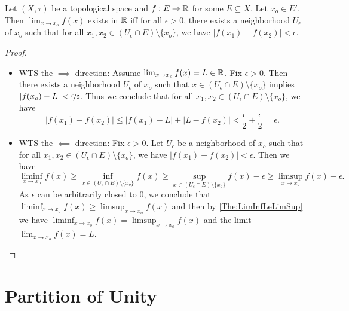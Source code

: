 \documentclass[screen,single]{techreport}
\numberwithin{equation}{section}
\begin{document}
\begin{theorem}\label{The:CauchyLemma}
  Let $(X,\tau)$ be a topological space and $f : E \to \mathbb{R}$ for some $E \subseteq X$.
  Let $x_o \in E'$.
  Then $\lim_{x \to x_o} f(x)$ exists in $\mathbb{R}$ iff for all $\epsilon > 0$, there exists a neighborhood $U_\epsilon$ of $x_o$ such that for all $x_1,x_2 \in (U_\epsilon \cap E) \setminus \{ x_o \}$, we have $|f(x_1)-f(x_2)| < \epsilon$.
\end{theorem}
\begin{proof}\
  \begin{itemize}
    \item WTS the $\implies$ direction: Assume $\lim_{x \to x_o} f(x) = L \in \mathbb{R}$.
    Fix $\epsilon > 0$.
    Then there exists a neighborhood $U_\epsilon$ of $x_o$ such that $x \in (U_\epsilon \cap E) \setminus \{x_o\}$ implies $|f(x_o)-L| < \nicefrac{\epsilon}{2}$.
    Thus we conclude that for all $x_1,x_2 \in (U_\epsilon \cap E) \setminus \{x_o\}$, we have
    \[
    |f(x_1)-f(x_2)| \le |f(x_1)-L|+|L-f(x_2)| < \frac{\epsilon}{2}+\frac{\epsilon}{2} = \epsilon.
    \]
    
    \item WTS the $\impliedby$ direction: Fix $\epsilon > 0$. Let $U_\epsilon$ be a neighborhood of $x_o$ such that for all $x_1,x_2 \in (U_\epsilon \cap E) \setminus \{x_o\}$, we have $|f(x_1)-f(x_2)| < \epsilon$.
    Then we have
    \[
    \liminf_{x \to x_o} f(x) \ge \inf_{x \in (U_\epsilon \cap E) \setminus \{x_o\}}f(x) \ge \sup_{x \in (U_\epsilon \cap E) \setminus \{x_o\}} f(x) - \epsilon \ge \limsup_{x \to x_o} f(x) - \epsilon.
    \]
    As $\epsilon$ can be arbitrarily closed to $0$, we conclude that $\liminf_{x \to x_o} f(x) \ge \limsup_{x \to x_o} f(x)$ and then by \cref{The:LimInfLeLimSup} we have $\liminf_{x \to x_o} f(x) = \limsup_{x \to x_o} f(x)$ and the limit $\lim_{x \to x_o} f(x) = L$.
  \end{itemize}
\end{proof}

\section{Partition of Unity}
\end{document}
